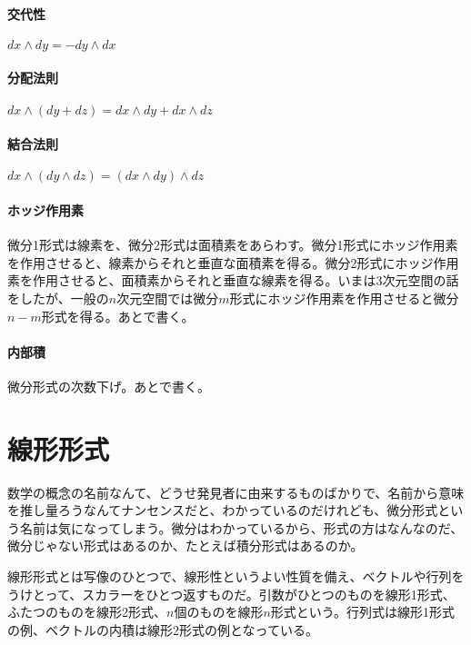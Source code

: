 \paragraph{交代性}

$ d x \wedge d y = - d y \wedge d x $

\paragraph{分配法則}

$ d x \wedge ( d y + d z ) = d x \wedge d y + d x \wedge d z $

\paragraph{結合法則}

$ d x \wedge (d y \wedge d z) = (d x \wedge d y) \wedge d z $

\paragraph{ホッジ作用素}

微分1形式は線素を、微分2形式は面積素をあらわす。微分1形式にホッジ作用素を作用させると、線素からそれと垂直な面積素を得る。微分2形式にホッジ作用素を作用させると、面積素からそれと垂直な線素を得る。いまは3次元空間の話をしたが、一般の$n$次元空間では微分$m$形式にホッジ作用素を作用させると微分$n-m$形式を得る。あとで書く。

\paragraph{内部積}

微分形式の次数下げ。あとで書く。


\section{線形形式}

数学の概念の名前なんて、どうせ発見者に由来するものばかりで、名前から意味を推し量ろうなんてナンセンスだと、わかっているのだけれども、微分形式という名前は気になってしまう。微分はわかっているから、形式の方はなんなのだ、微分じゃない形式はあるのか、たとえば積分形式はあるのか。

線形形式とは写像のひとつで、線形性というよい性質を備え、ベクトルや行列をうけとって、スカラーをひとつ返すものだ。引数がひとつのものを線形1形式、ふたつのものを線形2形式、$n$個のものを線形$n$形式という。行列式は線形1形式の例、ベクトルの内積は線形2形式の例となっている。

